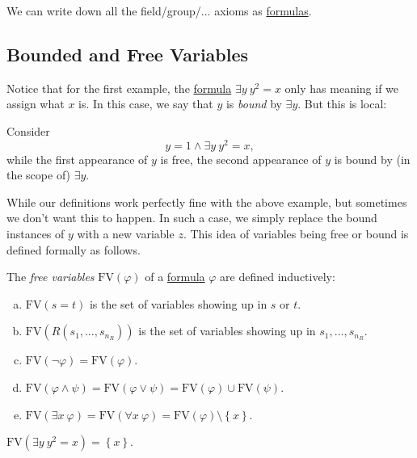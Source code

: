 \begin{eg}
	We can write down all the field/group/... axioms as \hyperref[def:formula]{formulas}.
\end{eg}

\subsection{Bounded and Free Variables}
Notice that for the first example, the \hyperref[def:formula]{formula} \(\exists y\ y^2 = x\) only has meaning if we assign what \(x\) is. In this case, we say that \(y\) is \emph{bound} by \(\exists y\). But this is local:

\begin{eg}
	Consider
	\[
		y=1 \land \exists y\ y^2 = x,
	\]
	while the first appearance of \(y\) is free, the second appearance of \(y\) is bound by (in the scope of) \(\exists y\).
\end{eg}

While our definitions work perfectly fine with the above example, but sometimes we don't want this to happen. In such a case, we simply replace the bound instances of \(y\) with a new variable \(z\). This idea of variables being free or bound is defined formally as follows.

\begin{definition}\label{def:free-variable}
	The \emph{free variables} \(\mathrm{FV}(\varphi )\) of a \hyperref[def:formula]{formula} \(\varphi \) are defined inductively:
	\begin{enumerate}[(a)]
		\item \(\mathrm{FV}(s=t) \) is the set of variables showing up in \(s\) or \(t\).
		\item \(\mathrm{FV}(R(s_1, \dots , s_{n_R})) \) is the set of variables showing up in \(s_1, \dots , s_{n_R}\).
		\item \(\mathrm{FV}(\lnot \varphi ) = \mathrm{FV} (\varphi )\).
		\item \(\mathrm{FV} (\varphi \land \psi ) = \mathrm{FV} (\varphi \lor \psi ) = \mathrm{FV}(\varphi ) \cup \mathrm{FV} (\psi ) \).
		\item \(\mathrm{FV} (\exists x\ \varphi ) = \mathrm{FV} (\forall x\ \varphi ) = \mathrm{FV} (\varphi ) \setminus \left\{ x \right\} \).
	\end{enumerate}
\end{definition}

\begin{eg}
	\(\mathrm{FV} (\exists y\ y^2 = x) = \left\{ x \right\} \).
\end{eg}

